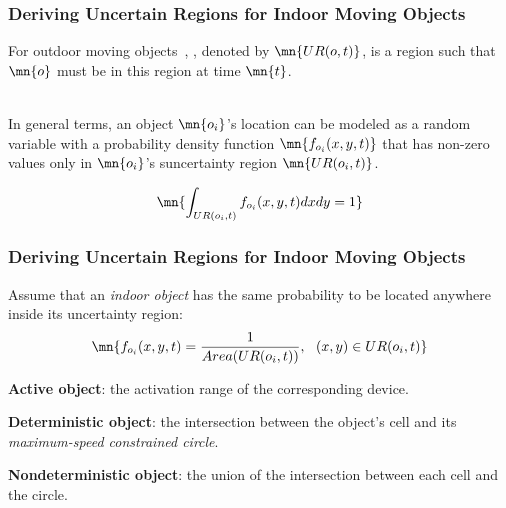 \begin{frame}
\end{frame}


\begin{frame}
\frametitle{Deriving Uncertain Regions for Indoor Moving Objects}

\textrm{For outdoor moving objects~\cite{cheng2004querying}, , denoted by $\mn{UR(o,t)}$, is a region such that $\mn{o}$ must be in this region at time $\mn{t}$.}\\~

In general terms, an object $\mn{o_i}$'s location can be modeled as a random variable with a probability density function $\mn{f_{o_i}(x,y,t)}$ that has non-zero values only in $\mn{o_i}$'s suncertainty region $\mn{UR(o_i, t)}$.

\begin{equation}
  \mn{\int_{UR(o_i,t)} f_{o_i}(x,y,t) dx dy = 1}
\end{equation}

\end{frame}


\begin{frame}
\frametitle{Deriving Uncertain Regions for Indoor Moving Objects}

Assume that an \emph{indoor object} has the same probability to be located anywhere inside its uncertainty region:
\begin{equation}
  \mn{f_{o_i}(x,y,t) = \frac{1}{Area(UR(o_i, t))}, ~~(x,y) \in UR(o_i, t)}
\end{equation}

\begin{fitemize}
  \item \textbf{Active object}: the activation range of the corresponding device.
  \item \textbf{Deterministic object}: the intersection between the object's cell and its \emph{maximum-speed constrained circle}.
  \item \textbf{Nondeterministic object}: the union of the intersection between each cell and the circle.
\end{fitemize}

\end{frame}


